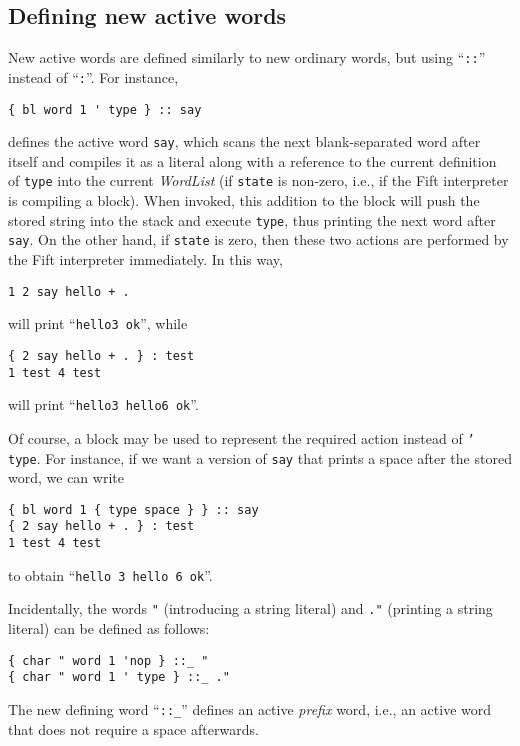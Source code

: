 \documentclass[12pt,oneside]{article}
\def\mysubsection#1{\subsection{#1}\fancyhead[C]{\small{\textsc{\textrm{\thesubsection.} #1}}}}
\begin{document}
\mysubsection{Defining new active words}\label{p:def.active}
New active words are defined similarly to new ordinary words, but using ``{\tt ::}'' instead of ``{\tt :}''. For instance,
\begin{verbatim}
{ bl word 1 ' type } :: say
\end{verbatim}
defines the active word {\tt say}, which scans the next blank-separated word after itself and compiles it as a literal along with a reference to the current definition of {\tt type} into the current {\em WordList} (if {\tt state} is non-zero, i.e., if the Fift interpreter is compiling a block). When invoked, this addition to the block will push the stored string into the stack and execute {\tt type}, thus printing the next word after {\tt say}. On the other hand, if {\tt state} is zero, then these two actions are performed by the Fift interpreter immediately. In this way,
\begin{verbatim}
1 2 say hello + .
\end{verbatim}
will print ``{\tt hello3 ok}'', while
\begin{verbatim}
{ 2 say hello + . } : test
1 test 4 test
\end{verbatim}
will print ``{\tt hello3 hello6 ok}''.

Of course, a block may be used to represent the required action instead of {\tt ' type}. For instance, if we want a version of {\tt say} that prints a space after the stored word, we can write
\begin{verbatim}
{ bl word 1 { type space } } :: say
{ 2 say hello + . } : test
1 test 4 test
\end{verbatim}
to obtain ``{\tt hello 3 hello 6 ok}''.

Incidentally, the words {\tt "} (introducing a string literal) and {\tt ."} (printing a string literal) can be defined as follows:
\begin{verbatim}
{ char " word 1 'nop } ::_ "
{ char " word 1 ' type } ::_ ."
\end{verbatim}
The new defining word ``{\tt ::\_}'' defines an active {\em prefix\/} word, i.e., an active word that does not require a space afterwards.
\end{document}
